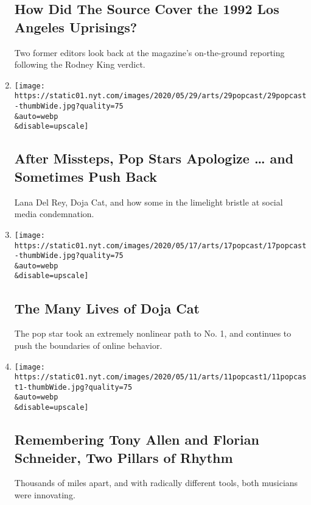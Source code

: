 \begin{enumerate}
  \hypertarget{how-did-the-source-cover-the-1992-los-angeles-uprisings}{%
  \subsection{How Did The Source Cover the 1992 Los Angeles
  Uprisings?}\label{how-did-the-source-cover-the-1992-los-angeles-uprisings}}

  Two former editors look back at the magazine's on-the-ground reporting
  following the Rodney King verdict.
\item
  \href{/2020/06/01/arts/music/popcast-lana-del-rey-doja-cat-apologies.html}{}

  \texttt{[image: https://static01.nyt.com/images/2020/05/29/arts/29popcast/29popcast-thumbWide.jpg?quality=75\\\&auto=webp\\\&disable=upscale]}

  \hypertarget{after-missteps-pop-stars-apologize--and-sometimes-push-back}{%
  \subsection{After Missteps, Pop Stars Apologize \ldots{} and Sometimes
  Push
  Back}\label{after-missteps-pop-stars-apologize--and-sometimes-push-back}}

  Lana Del Rey, Doja Cat, and how some in the limelight bristle at
  social media condemnation.
\item
  \href{/2020/05/18/arts/music/popcast-doja-cat.html}{}

  \texttt{[image: https://static01.nyt.com/images/2020/05/17/arts/17popcast/17popcast-thumbWide.jpg?quality=75\\\&auto=webp\\\&disable=upscale]}

  \hypertarget{the-many-lives-of-doja-cat}{%
  \subsection{The Many Lives of Doja
  Cat}\label{the-many-lives-of-doja-cat}}

  The pop star took an extremely nonlinear path to No. 1, and continues
  to push the boundaries of online behavior.
\item
  \href{/2020/05/11/arts/music/popcast-tony-allen-florian-schneider.html}{}

  \texttt{[image: https://static01.nyt.com/images/2020/05/11/arts/11popcast1/11popcast1-thumbWide.jpg?quality=75\\\&auto=webp\\\&disable=upscale]}

  \hypertarget{remembering-tony-allen-and-florian-schneider-two-pillars-of-rhythm}{%
  \subsection{Remembering Tony Allen and Florian Schneider, Two Pillars
  of
  Rhythm}\label{remembering-tony-allen-and-florian-schneider-two-pillars-of-rhythm}}

  Thousands of miles apart, and with radically different tools, both
  musicians were innovating.
\end{enumerate}

